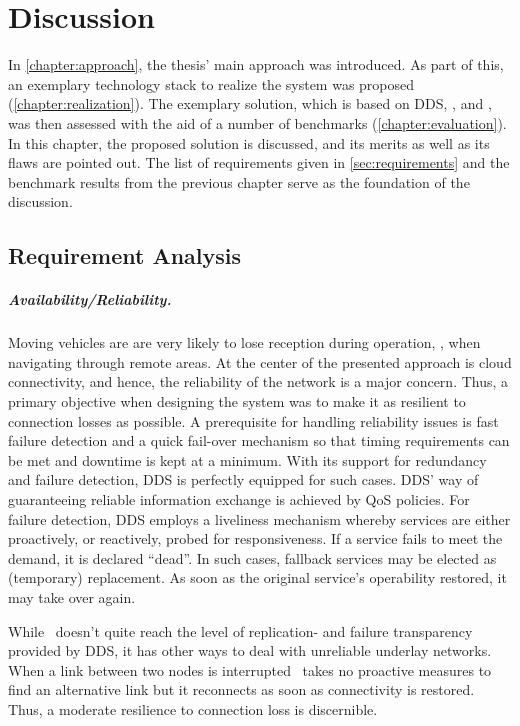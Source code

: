 \chapter{Discussion}\label{chapter:discussion}
In \autoref{chapter:approach}, the thesis' main approach was introduced. As part of this, an exemplary technology stack to realize the system was proposed (\cf \autoref{chapter:realization}). The exemplary solution, which is based on DDS, \docker , and \wnet , was then assessed with the aid of a number of benchmarks (\cf \autoref{chapter:evaluation}). In this chapter, the proposed solution is discussed, and its merits as well as its flaws are pointed out. The list of requirements given in \autoref{sec:requirements} and the benchmark results from the previous chapter serve as the foundation of the discussion. 


\section{Requirement Analysis}

\paragraph{Availability/Reliability.}
Moving vehicles are are very likely to lose reception during operation, \eg , when navigating through remote areas. At the center of the presented approach is cloud connectivity, and hence, the reliability of the network is a major concern. Thus, a primary objective when designing the system was to make it as resilient to connection losses as possible. A prerequisite for handling reliability issues is fast failure detection and a quick fail-over mechanism so that timing requirements can be met and downtime is kept at a minimum. With its support for redundancy and failure detection, DDS is perfectly equipped for such cases. DDS' way of guaranteeing reliable information exchange is achieved by QoS policies. For failure detection, DDS employs a liveliness mechanism whereby services are either proactively, or reactively, probed for responsiveness. If a service fails to meet the demand, it is declared ``dead''. In such cases, fallback services may be elected as (temporary) replacement. As soon as the original service's operability restored, it may take over again.

While \wnet\ doesn't quite reach the level of replication- and failure transparency provided by DDS, it has other ways to deal with unreliable underlay networks. When a link between two nodes is interrupted \weave\ takes no proactive measures to find an alternative link but it reconnects as soon as connectivity is restored. Thus, a moderate resilience to connection loss is discernible.

